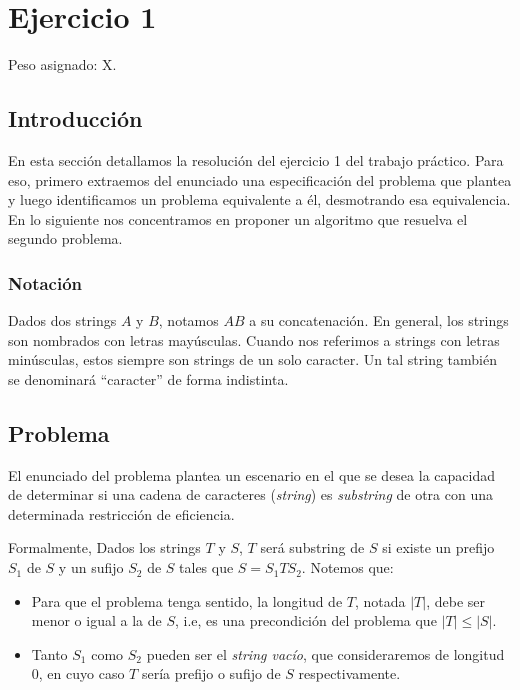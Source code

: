 \section{Ejercicio 1}

Peso asignado: X.

\subsection{Introducción}

En esta sección detallamos la resolución del ejercicio 1 del trabajo práctico. Para eso, primero extraemos del enunciado una especificación del problema que plantea y luego identificamos un problema equivalente a él, desmotrando esa equivalencia. En lo siguiente nos concentramos en proponer un algoritmo que resuelva el segundo problema.

\subsubsection{Notación}

Dados dos strings $A$ y $B$, notamos $AB$ a su concatenación. En general, los strings son nombrados con letras mayúsculas. Cuando nos referimos a strings con letras minúsculas, estos siempre son strings de un solo caracter. Un tal string también se denominará ``caracter'' de forma indistinta.

\subsection{Problema}

El enunciado del problema plantea un escenario en el que se desea la capacidad de determinar si una cadena de caracteres (\textit{string}) es \textit{substring} de otra con una determinada restricción de eficiencia.

Formalmente, Dados los strings $T$ y $S$, $T$ será substring de $S$ si existe un prefijo $S_1$ de $S$ y un sufijo $S_2$ de $S$ tales que $S = S_1 T S_2$. Notemos que:
\begin{itemize}
\item Para que el problema tenga sentido, la longitud de $T$, notada $|T|$, debe ser menor o igual a la de $S$, i.e, es una precondición del problema que $|T| \leq |S|$.
\item Tanto $S_1$ como $S_2$ pueden ser el \textit{string vacío}, que consideraremos de longitud $0$, en cuyo caso $T$ sería prefijo o sufijo de $S$ respectivamente.
\end{itemize}

